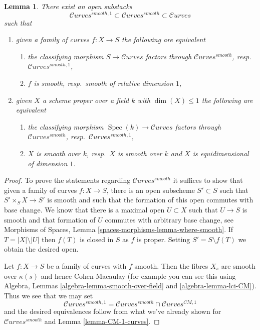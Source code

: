\documentclass{stacks-project}
\theoremstyle{plain}
\newtheorem{lemma}[subsection]{Lemma}
\theoremstyle{definition}
\theoremstyle{remark}
\numberwithin{equation}{subsection}
\def\Spec{\mathop{\mathrm{Spec}}}
\def\Curvesstack{\mathcal{C}\!\mathit{urves}}
\begin{document}
\begin{lemma}
\label{lemma-smooth-curves}
There exist an open substacks
$$
\Curvesstack^{smooth, 1} \subset \Curvesstack^{smooth} \subset \Curvesstack
$$
such that
\begin{enumerate}
\item given a family of curves $f : X \to S$ the following are equivalent
\begin{enumerate}
\item the classifying morphism $S \to \Curvesstack$ factors
through $\Curvesstack^{smooth}$, resp.\ $\Curvesstack^{smooth, 1}$,
\item $f$ is smooth, resp.\ smooth of relative dimension $1$,
\end{enumerate}
\item given $X$ a scheme proper over a field $k$ with
$\dim(X) \leq 1$ the following are equivalent
\begin{enumerate}
\item the classifying morphism $\Spec(k) \to \Curvesstack$
factors through $\Curvesstack^{smooth}$, resp.\ $\Curvesstack^{smooth, 1}$,
\item $X$ is smooth over $k$, resp.\ $X$ is smooth over $k$ and
$X$ is equidimensional of dimension $1$.
\end{enumerate}
\end{enumerate}
\end{lemma}

\begin{proof}
To prove the statements regarding $\Curvesstack^{smooth}$
it suffices to show that given a family of curves
$f : X \to S$, there is an open subscheme $S' \subset S$
such that $S' \times_S X \to S'$ is smooth and such that the
formation of this open commutes with base change.
We know that there is a maximal open $U \subset X$ such
that $U \to S$ is smooth and that formation of $U$ commutes
with arbitrary base change, see
Morphisms of Spaces, Lemma \ref{spaces-morphisms-lemma-where-smooth}.
If $T = |X| \setminus |U|$ then $f(T)$ is closed in $S$ as $f$ is proper.
Setting $S' = S \setminus f(T)$ we obtain the desired open.

\medskip\noindent
Let $f : X \to S$ be a family of curves with $f$ smooth.
Then the fibres $X_s$ are smooth over $\kappa(s)$ and hence
Cohen-Macaulay (for example you can see this using
Algebra, Lemmas \ref{algebra-lemma-smooth-over-field} and
\ref{algebra-lemma-lci-CM}). Thus we see that we may set
$$
\Curvesstack^{smooth, 1} = \Curvesstack^{smooth} \cap
\Curvesstack^{CM, 1}
$$
and the desired equivalences follow from what we've already
shown for $\Curvesstack^{smooth}$ and Lemma \ref{lemma-CM-1-curves}.
\end{proof}
\end{document}

